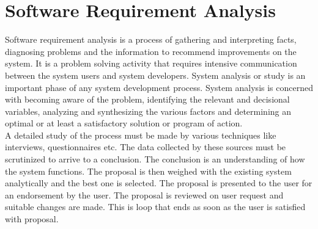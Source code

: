 \section{Software Requirement Analysis}
Software requirement analysis is a process of gathering and interpreting facts, diagnosing problems and the information to recommend improvements on the system. It is a problem solving activity that requires intensive communication between the system users and system developers. System analysis or study is an important phase of any system development process. System analysis is concerned with becoming aware of the problem, identifying the relevant and decisional variables, analyzing and synthesizing the various factors and determining an optimal or at least a satisfactory solution or program of action.\\

\noindent A detailed study of the process must be made by various techniques like interviews, questionnaires etc. The data collected by these sources must be scrutinized to arrive to a conclusion. The conclusion is an understanding of how the system functions. The proposal is then weighed with the existing system analytically and the best one is selected. The proposal is presented to the user for an endorsement by the user. The proposal is reviewed on user request and suitable changes are made. This is loop that ends as soon as the user is satisfied with proposal.\\

